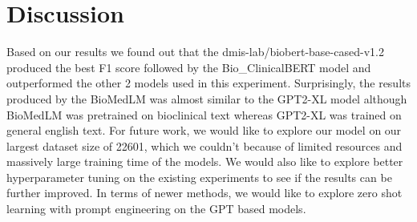 \documentclass[manuscript,screen,review,nonacm]{acmart}
\begin{document}
\section{Discussion}

Based on our results we found out that the dmis-lab/biobert-base-cased-v1.2 produced the best F1 score followed by the Bio\_ClinicalBERT model and outperformed the other 2 models used in this experiment. Surprisingly, the results produced by the BioMedLM was almost similar to the GPT2-XL model although BioMedLM was pretrained on bioclinical text whereas GPT2-XL was trained on general english text. For future work, we would like to explore our model on our largest dataset size of 22601, which we couldn't because of limited resources and massively large training time of the models. We would also like to explore better hyperparameter tuning on the existing experiments to see if the results can be further improved. In terms of newer methods, we would like to explore zero shot learning with prompt engineering on the GPT based models. 




\end{document}
